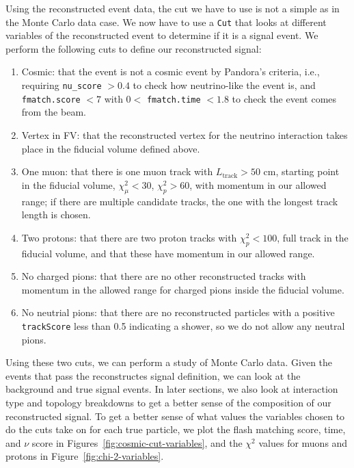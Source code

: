 \documentclass{article}
\begin{document}
Using the reconstructed event data, the cut we have to use is not a simple as in the Monte Carlo data case. 
We now have to use a \verb|Cut| that looks at different variables of the reconstructed event to determine if 
it is a signal event. We perform the following cuts to define our reconstructed signal:
\begin{enumerate}[label=(\roman*)]
    \item Cosmic: that the event is not a cosmic event by Pandora's criteria, i.e., requiring \verb|nu_score| $> 0.4$ to 
    check how neutrino-like the event is, and \verb|fmatch.score| $< 7$ with $0 <$ \verb|fmatch.time| $< 1.8$ to check the event comes from the beam.
    \item Vertex in FV\@: that the reconstructed vertex for the neutrino interaction takes place in the fiducial volume defined above.
    \item One muon: that there is one muon track with $L_{\text{track}} > 50$ cm, starting point in the fiducial volume, $\chi^2_\mu < 30$, $\chi^2_p > 60$, with momentum in our allowed range; if
    there are multiple candidate tracks, the one with the longest track length is chosen.
    \item Two protons: that there are two proton tracks with $\chi^2_p < 100$, full track in the fiducial volume, and that these have momentum in our allowed range.
    \item No charged pions: that there are no other reconstructed tracks with momentum in the allowed range for charged pions inside the fiducial volume.
    \item No neutrial pions: that there are no reconstructed particles with a positive \verb|trackScore| less than 0.5 indicating a shower, so we do not allow any neutral pions.
\end{enumerate}

Using these two cuts, we can perform a study of Monte Carlo data. Given the events that pass the
reconstructes signal definition, we can look at the background and true signal events. In later sections, 
we also look at interaction type and topology breakdowns to get a better sense of the composition of our reconstructed signal.
To get a better sense of what values the variables chosen to do the cuts take on for each true particle, we plot
the flash matching score, time, and $\nu$ score in Figures~\ref{fig:cosmic-cut-variables}, and the $\chi^2$ values for muons and protons in Figure~\ref{fig:chi-2-variables}.
\end{document}
